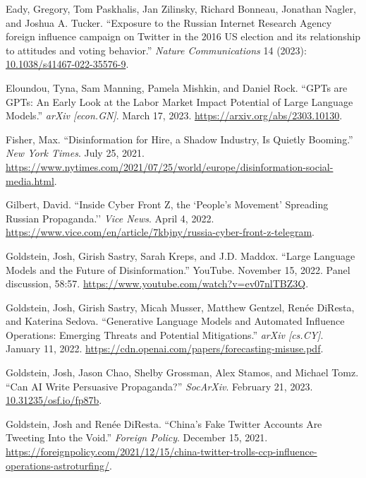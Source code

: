 \documentclass{article}
\begin{document}
\begin{thebibliography}{9}
  Eady, Gregory, Tom Paskhalis, Jan Zilinsky, Richard Bonneau, Jonathan Nagler, and Joshua A. Tucker. ``Exposure to the Russian Internet Research Agency foreign influence campaign on Twitter in the 2016 US election and its relationship to attitudes and voting behavior.'' \textit{Nature Communications} 14 (2023): \href{https://www.nature.com/articles/s41467-022-35576-9}{10.1038/s41467-022-35576-9}.

  Eloundou, Tyna, Sam Manning, Pamela Mishkin, and Daniel Rock. ``GPTs are GPTs: An Early Look at the Labor Market Impact Potential of Large Language Models.'' \textit{arXiv [econ.GN]}. March 17, 2023. \href{https://arxiv.org/abs/2303.10130}{https://arxiv.org/abs/2303.10130}.

  Fisher, Max. ``Disinformation for Hire, a Shadow Industry, Is Quietly Booming.'' \textit{New York Times}. July 25, 2021. \href{https://www.nytimes.com/2021/07/25/world/europe/disinformation-social-media.html}{https://www.nytimes.com/2021/07/25/world/europe/disinformation-social-media.html}. 

  Gilbert, David. ``Inside Cyber Front Z, the `People's Movement’ Spreading Russian Propaganda.'' \textit{Vice News}. April 4, 2022. \href{https://www.vice.com/en/article/7kbjny/russia-cyber-front-z-telegram}{https://www.vice.com/en/article/7kbjny/russia-cyber-front-z-telegram}.

  Goldstein, Josh, Girish Sastry, Sarah Kreps, and J.D. Maddox. ``Large Language Models and the Future of Disinformation.'' YouTube. November 15, 2022. Panel discussion, 58:57. \href{https://www.youtube.com/watch?v=ev07nlTBZ3Q}{https://www.youtube.com/watch?v=ev07nlTBZ3Q}.

  Goldstein, Josh, Girish Sastry, Micah Musser, Matthew Gentzel, Renée DiResta, and Katerina Sedova. ``Generative Language Models and Automated Influence Operations: Emerging Threats and Potential Mitigations.'' \textit{arXiv [cs.CY]}. January 11, 2022. \href{https://cdn.openai.com/papers/forecasting-misuse.pdf}{https://cdn.openai.com/papers/forecasting-misuse.pdf}.

  Goldstein, Josh, Jason Chao, Shelby Grossman, Alex Stamos, and Michael Tomz. ``Can AI Write Persuasive Propaganda?'' \textit{SocArXiv}. February 21, 2023. \href{10.31235/osf.io/fp87b}{10.31235/osf.io/fp87b}.

  Goldstein, Josh and Renée DiResta. ``China's Fake Twitter Accounts Are Tweeting Into the Void.'' \textit{Foreign Policy}. December 15, 2021. \href{https://foreignpolicy.com/2021/12/15/china-twitter-trolls-ccp-influence-operations-astroturfing/}{https://foreignpolicy.com/2021/12/15/china-twitter-trolls-ccp-influence-operations-astroturfing/}. 


\end{thebibliography}
\end{document}
